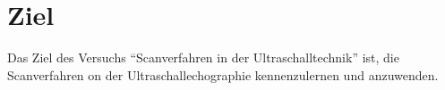 \section{Ziel}
\label{sec:Ziel}
Das Ziel des Versuchs \enquote{Scanverfahren in der Ultraschalltechnik} ist, die Scanverfahren on der Ultraschallechographie kennenzulernen und anzuwenden.